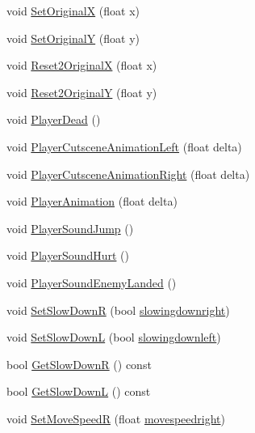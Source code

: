 \begin{DoxyCompactItemize}
\item 
void \hyperlink{classPlayerObject_ac1f2670c32ea1222ddcbbdd4d4fda0f1}{Set\+OriginalX} (float x)
\item 
void \hyperlink{classPlayerObject_ae20d0ed730204b7d471ab13d32e9626e}{Set\+OriginalY} (float y)
\item 
void \hyperlink{classPlayerObject_a9dd4494cfaeb6dfa74b84ad19df5d650}{Reset2\+OriginalX} (float x)
\item 
void \hyperlink{classPlayerObject_af545457981fc51138ba2c735bdeecb31}{Reset2\+OriginalY} (float y)
\item 
void \hyperlink{classPlayerObject_a180ae1fcbd6b7eb4491cbf1f846b8b25}{Player\+Dead} ()
\item 
void \hyperlink{classPlayerObject_a7ee73e003e589eb3f41392013a0dbcae}{Player\+Cutscene\+Animation\+Left} (float delta)
\item 
void \hyperlink{classPlayerObject_ac5935efe401480fd63bb5a2a9a09c54d}{Player\+Cutscene\+Animation\+Right} (float delta)
\item 
void \hyperlink{classPlayerObject_a34d8b9e121f017b3163bb5b8aa392af8}{Player\+Animation} (float delta)
\item 
void \hyperlink{classPlayerObject_a4f41bf61971eb3a71346681f25a97fc0}{Player\+Sound\+Jump} ()
\item 
void \hyperlink{classPlayerObject_aca6d9328e3f55987fbe4762c10b893b2}{Player\+Sound\+Hurt} ()
\item 
void \hyperlink{classPlayerObject_ad133797db4760e6ae229eb7889888a89}{Player\+Sound\+Enemy\+Landed} ()
\item 
void \hyperlink{classPlayerObject_a4b250de8af994ba9c3d7020c440a9d5d}{Set\+Slow\+DownR} (bool \hyperlink{classPlayerObject_a3f5b7c904edac7e254297849659d01b3}{slowingdownright})
\item 
void \hyperlink{classPlayerObject_a17ffd5b043b80c4070d15c2f92c93852}{Set\+Slow\+DownL} (bool \hyperlink{classPlayerObject_a4894d3619cdf5cb0c35c480aa89502a4}{slowingdownleft})
\item 
bool \hyperlink{classPlayerObject_a39d8a278186eee72968d8edd3ab681e8}{Get\+Slow\+DownR} () const 
\item 
bool \hyperlink{classPlayerObject_a7f7fa1fd6ac9c5dc038ebae46c932a25}{Get\+Slow\+DownL} () const 
\item 
void \hyperlink{classPlayerObject_a9147fbd6a35b05cc1e1a6faeb9b8bf22}{Set\+Move\+SpeedR} (float \hyperlink{classPlayerObject_aabfd7e3dac7eaa6851528fdefc65c734}{movespeedright})
\item 

\end{DoxyCompactItemize}

